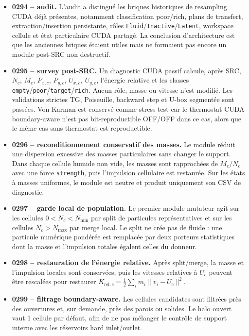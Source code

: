 \documentclass[11pt,a4paper]{article}
\begin{document}
\begin{itemize}[nosep]
  \item \textbf{0294 -- audit.} L'audit a distingué les briques historiques de resampling CUDA déjà présentes, notamment classification poor/rich, plans de transfert, extraction/insertion persistante, rôles \texttt{Fluid}/\texttt{Inactive}/\texttt{Latent}, workspace cellule et état particulaire CUDA partagé. La conclusion d'architecture est que les anciennes briques étaient utiles mais ne formaient pas encore un module post-SRC non destructif.
  \item \textbf{0295 -- survey post-SRC.} Un diagnostic CUDA passif calcule, après SRC, $N_c$, $M_c$, $P_{x,c}$, $P_{y,c}$, $U_{x,c}$, $U_{y,c}$, l'énergie relative et les classes \texttt{empty}/\texttt{poor}/\texttt{target}/\texttt{rich}. Aucun rôle, masse ou vitesse n'est modifié. Les validations strictes TG, Poiseuille, backward step et U-box segmentée sont passées. Von Karman est conservé comme stress test car le thermostat CUDA boundary-aware n'est pas bit-reproductible OFF/OFF dans ce cas, alors que le même cas sans thermostat est reproductible.
  \item \textbf{0296 -- reconditionnement conservatif des masses.} Le module réduit une dispersion excessive des masses particulaires sans changer le support. Dans chaque cellule humide non vide, les masses sont rapprochées de $M_c/N_c$ avec une force \texttt{strength}, puis l'impulsion cellulaire est restaurée. Sur les états à masses uniformes, le module est neutre et produit uniquement son CSV de diagnostic.
  \item \textbf{0297 -- garde local de population.} Le premier module mutateur agit sur les cellules $0<N_c<N_{\min}$ par split de particules représentatives et sur les cellules $N_c>N_{\max}$ par merge local. Le split ne crée pas de fluide : une particule numérique pondérée est remplacée par deux porteurs statistiques dont la masse et l'impulsion totales égalent celles du donneur.
  \item \textbf{0298 -- restauration de l'énergie relative.} Après split/merge, la masse et l'impulsion locales sont conservées, puis les vitesses relatives à $U_c$ peuvent être rescalées pour restaurer $K_{\mathrm{rel},c}=\frac12\sum_i m_i\lVert v_i-U_c\rVert^2$.
  \item \textbf{0299 -- filtrage boundary-aware.} Les cellules candidates sont filtrées près des ouvertures et, sur demande, près des parois ou solides. Le halo ouvert vaut 1 cellule par défaut, afin de ne pas mélanger le contrôle de support interne avec les réservoirs hard inlet/outlet.
\end{itemize}
\end{document}
